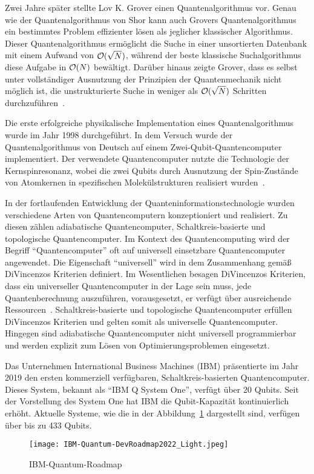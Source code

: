 Zwei Jahre später stellte Lov K. Grover einen Quantenalgorithmus vor.
Genau wie der Quantenalgorithmus von Shor kann auch Grovers Quantenalgorithmus ein bestimmtes Problem effizienter lösen als jeglicher klassischer Algorithmus.
Dieser Quantenalgorithmus ermöglicht die Suche in einer unsortierten Datenbank mit einem Aufwand von \(\operatorname{\mathcal{O}}(\sqrt N)\), 
während der beste klassische Suchalgorithmus diese Aufgabe in \(\operatorname{\mathcal{O}}(N)\) bewältigt. 
Darüber hinaus zeigte Grover, 
dass es selbst unter vollständiger Ausnutzung der Prinzipien der Quantenmechanik nicht möglich ist, 
die unstrukturierte Suche in weniger als \(\operatorname{\mathcal{O}}(\sqrt N)\) Schritten durchzuführen~\cite{grover1996fast}.

Die erste erfolgreiche physikalische Implementation eines Quantenalgorithmus wurde im Jahr 1998 durchgeführt.
In dem Versuch wurde der Quantenalgorithmus von Deutsch auf einem Zwei-Qubit-Quantencomputer implementiert.
Der verwendete Quantencomputer nutzte die Technologie der Kernspinresonanz, 
wobei die zwei Qubits durch Ausnutzung der Spin-Zustände von Atomkernen in spezifischen Molekülstrukturen realisiert wurden~\cite{Jones_1998}.

In der fortlaufenden Entwicklung der Quanteninformationstechnologie wurden verschiedene Arten von Quantencomputern konzeptioniert und realisiert.
Zu diesen zählen adiabatische Quantencomputer, Schaltkreis-basierte und topologische Quantencomputer.
Im Kontext des Quantencomputing wird der Begriff "`Quantencomputer"' oft auf universell einsetzbare Quantencomputer angewendet.
Die Eigenschaft "`universell"' wird in dem Zusammenhang gemäß DiVincenzos Kriterien definiert. 
Im Wesentlichen besagen DiVincenzos Kriterien, dass ein universeller Quantencomputer in der Lage sein muss, jede Quantenberechnung auszuführen, vorausgesetzt, er verfügt über ausreichende Ressourcen~\cite{DiVincenzo_2000}.
Schaltkreis-basierte und topologische Quantencomputer erfüllen DiVincenzos Kriterien und gelten somit als universelle Quantencomputer.
Hingegen sind adiabatische Quantencomputer nicht universell programmierbar und werden explizit zum Lösen von Optimierungsproblemen eingesetzt.

Das Unternehmen International Business Machines (IBM) präsentierte im Jahr 2019 den ersten kommerziell verfügbaren, Schaltkreis-basierten Quantencomputer.
Dieses System, bekannt als "`IBM Q System One"', verfügt über 20 Qubits.
Seit der Vorstellung des System One hat IBM die Qubit-Kapazität kontinuierlich erhöht. 
Aktuelle Systeme, wie die in der Abbildung~\ref{fig:IBM-Quantum-DevRoadmap2022} dargestellt sind, verfügen über bis zu 433 Qubits.
\begin{figure}[H]
    \centering
    \texttt{[image: IBM-Quantum-DevRoadmap2022\_Light.jpeg]}
    \caption{IBM-Quantum-Roadmap~\cite{IBM_2023}}
    \label{fig:IBM-Quantum-DevRoadmap2022}
\end{figure}

